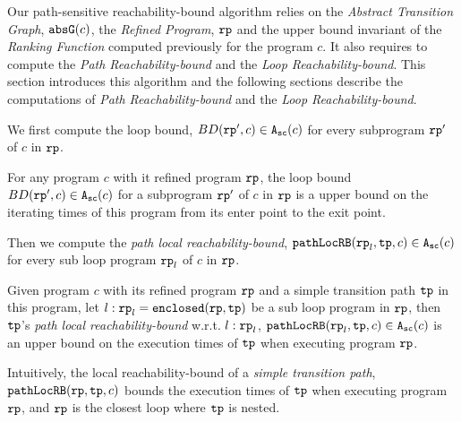 Our path-sensitive reachability-bound algorithm relies on the \emph{Abstract Transition Graph}, $\mathtt{abs}{\mathtt{G}}(c)$, the \emph{Refined Program}, $\mathtt{rp}$ and the upper bound invariant of the \emph{Ranking Function} computed previously for the program $c$.
It also requires to compute the \emph{Path Reachability-bound} and the \emph{Loop Reachability-bound}.
This section introduces this algorithm and the following sections describe the computations of \emph{Path Reachability-bound} and the \emph{Loop Reachability-bound}. 


We first compute the loop bound, $BD(\mathtt{rp}', c) \in {\ensuremath{\mathtt{A_{sc}}}}(c)$ for every subprogram $\mathtt{rp}'$ of $c$ in $\mathtt{rp}$.
\begin{defn}
  For any program $c$ with it refined program $\mathtt{rp}$,
  the loop bound $BD(\mathtt{rp}', c) \in {\ensuremath{\mathtt{A_{sc}}}}(c)$ for a subprogram $\mathtt{rp}'$ of $c$ in $\mathtt{rp}$ is a upper bound on the iterating times of this program from its enter point to the exit point.
\end{defn}

Then we compute the \emph{path local reachability-bound}, $\mathtt{pathLocRB}(\mathtt{rp}_l, \mathtt{tp}, c) \in {\ensuremath{\mathtt{A_{sc}}}}(c)$ for every sub loop program $\mathtt{rp}_l$ of $c$ in $\mathtt{rp}$.
\begin{defn}
  Given program $c$ with its refined program $\mathtt{rp}$ and a simple transition path $\mathtt{tp}$ in this program, 
  let $l: \mathtt{rp}_l = \mathtt{enclosed}(\mathtt{rp}, \mathtt{tp})$ be a sub loop program in $\mathtt{rp}$,
  then $\mathtt{tp}$'s \emph{path local reachability-bound} w.r.t. $l: \mathtt{rp}_l$,  $\mathtt{pathLocRB}(\mathtt{rp}_l, \mathtt{tp}, c) \in {\ensuremath{\mathtt{A_{sc}}}}(c)$
  is an upper bound on the execution times of $\mathtt{tp}$ when executing program $\mathtt{rp}$.
\end{defn}
Intuitively, the local reachability-bound of a \emph{simple transition path},
$\mathtt{pathLocRB}(\mathtt{rp}, \mathtt{tp}, c)$ bounds the execution times of $\mathtt{tp}$ when executing program $\mathtt{rp}$,
and $\mathtt{rp}$ is the closest loop where $\mathtt{tp}$ is nested.

